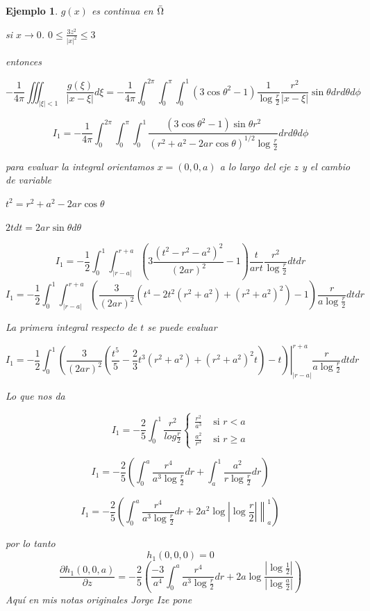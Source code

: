 \documentclass[a4paper,10pt]{book}
\newtheorem{ejemplo}{Ejemplo}
\begin{document}
\begin{enumerate}
\begin{ejemplo}
$g(x)$ es continua en $\Bar{\Omega}$

si $x\rightarrow 0 $. $ 0\leq \frac{3 z ^2}{|x|^2 }\leq 3 $

entonces

\[
-\frac{1}{4\pi} \iiint_{|\xi|<1 } \frac{g(\xi)}{ |x-\xi|} d\xi  =  -\frac{1}{4\pi} \int_0^{2\pi}\int_0^{\pi}\int_0^1 (3\cos\theta^2-1) \frac{1}{\log \frac{r}{2}} \frac{r^2}{|x-\xi| } \sin \theta dr d\theta d\phi
\]


\[
I_1 =  -\frac{1}{4\pi} \int_0^{2\pi}\int_0^{\pi}\int_0^1 \frac{(3\cos\theta^2-1)\sin \theta r^2 }{ \left(r^2 +a^2 -2 a r \cos{\theta} \right)^{1/2} \log \frac{r}{2}}  dr d\theta d\phi
\]

para evaluar la integral orientamos $x = (0,0,a)$ a lo largo del eje $z$ y el cambio de variable

$t^2 = r^2 +a^2 -2 a r \cos{\theta}$

$2t dt = 2 a r \sin{\theta} d\theta$

\[
I_1= - \frac{1}{2} \int_0^1 \int_{|r-a|}^{r+a} \left(  3 \frac{(t^2 - r^2 -a^2)^2}{(2ar)^2} -1 \right) \frac{t}{art} \frac{r^2}{\log \frac{r}{2}} dt dr
\]
\[
I_1= - \frac{1}{2} \int_0^1 \int_{|r-a|}^{r+a} \left( \frac{3}{(2ar)^2} (t^4 - 2t^2 ( r^2 +a^2) + (r^2+a^2)^2 )  -1\right)  \frac{r}{a \log \frac{r}{2}}  dt dr 
\]

La primera integral respecto de $t$ se puede evaluar 

\[
I_1= - \frac{1}{2} \int_0^1 \left.  \left( \frac{3}{(2ar)^2} \left( \frac{t^5}{5} - \frac{2}{3} t^3( r^2 +a^2) + (r^2+a^2)^2 t \right)  -t\right) \right|_{|r-a|}^{r+a} \frac{r}{a \log \frac{r}{2}}  dt dr 
\]

Lo que nos da

\[
I_1 = -\frac{2}{5} \int_0^1 \frac{r^2}{log \frac{r}{2}}  \left\{
\begin{aligned}
\frac{ r^2}{ a^3} & \text{ si } r<a \\
\frac{ a^2}{ r^3} & \text{ si } r\geq a 
\end{aligned}
\right. 
\]

\[
I_1= -\frac{2}{5} \left(  \int_0^a \frac{r^4}{ a^3 \log \frac{r}{2} }  dr  + \int_a^1 \frac{a^2}{r \log \frac{r}{2} } dr \right)
\]

\[
I_1= -\frac{2}{5} \left(  \int_0^a \frac{r^4}{ a^3 \log \frac{r}{2} }  dr  + \left. 2 a^2 \log| \log \frac{r}{2}| \right\|_a^1  \right)
\]

por lo tanto 
\[
h_1(0,0,0)=0
\]
\[\frac{\partial h_1 (0,0,a) }{\partial z} =  -\frac{2}{5} \left(  \frac{-3}{a^4} \int_0^a \frac{r^4}{ a^3 \log \frac{r}{2} }  dr  + 2 a \log \frac{| \log \frac{1}{2} | }{| \log \frac{a}{2} |}   \right)\]
Aquí en mis notas originales Jorge Ize pone 



\end{ejemplo}
\end{enumerate}
\end{document}
